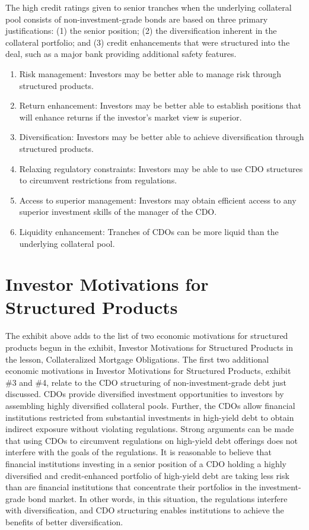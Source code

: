 \documentclass[11pt]{article}
\begin{document}
The high credit ratings given to senior tranches when the underlying collateral pool consists of non-investment-grade bonds are based on three primary justifications: (1) the senior position; (2) the diversification inherent in the collateral portfolio; and (3) credit enhancements that were structured into the deal, such as a major bank providing additional safety features.

\begin{enumerate}
  \item Risk management: Investors may be better able to manage risk through structured products.

  \item Return enhancement: Investors may be better able to establish positions that will enhance returns if the investor's market view is superior.

  \item Diversification: Investors may be better able to achieve diversification through structured products.

  \item Relaxing regulatory constraints: Investors may be able to use CDO structures to circumvent restrictions from regulations.

  \item Access to superior management: Investors may obtain efficient access to any superior investment skills of the manager of the CDO.

  \item Liquidity enhancement: Tranches of CDOs can be more liquid than the underlying collateral pool.

\end{enumerate}

\section*{Investor Motivations for Structured Products}
The exhibit above adds to the list of two economic motivations for structured products begun in the exhibit, Investor Motivations for Structured Products in the lesson, Collateralized Mortgage Obligations. The first two additional economic motivations in Investor Motivations for Structured Products, exhibit \#3 and \#4, relate to the CDO structuring of non-investment-grade debt just discussed. CDOs provide diversified investment opportunities to investors by assembling highly diversified collateral pools. Further, the CDOs allow financial institutions restricted from substantial investments in high-yield debt to obtain indirect exposure without violating regulations. Strong arguments can be made that using CDOs to circumvent regulations on high-yield debt offerings does not interfere with the goals of the regulations. It is reasonable to believe that financial institutions investing in a senior position of a CDO holding a highly diversified and credit-enhanced portfolio of high-yield debt are taking less risk than are financial institutions that concentrate their portfolios in the investment-grade bond market. In other words, in this situation, the regulations interfere with diversification, and CDO structuring enables institutions to achieve the benefits of better diversification.
\end{document}
